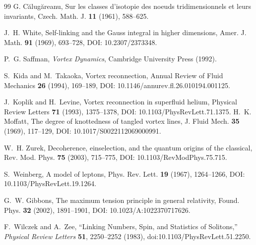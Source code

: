 \documentclass[11pt]{article}
\theoremstyle{definition}
\theoremstyle{plain}
\theoremstyle{remark}
\begin{document}
\begin{thebibliography}{99}
            G. C\u{a}lug\u{a}reanu,
            \newblock Sur les classes d'isotopie des noeuds tridimensionnels et leurs invariants,
            \newblock Czech. Math. J. \textbf{11} (1961), 588--625.

            J.~H. White,
            \newblock Self-linking and the Gauss integral in higher dimensions,
            \newblock Amer. J. Math. \textbf{91} (1969), 693--728,
            \newblock DOI: 10.2307/2373348.

            P.~G. Saffman,
            \newblock \emph{Vortex Dynamics},
            \newblock Cambridge University Press (1992).


            S.~Kida and M.~Takaoka,
            \newblock Vortex reconnection,
            \newblock Annual Review of Fluid Mechanics \textbf{26} (1994), 169--189,
            \newblock DOI: 10.1146/annurev.fl.26.010194.001125.

            J.~Koplik and H.~Levine,
            \newblock Vortex reconnection in superfluid helium,
            \newblock Physical Review Letters \textbf{71} (1993), 1375--1378,
            \newblock DOI: 10.1103/PhysRevLett.71.1375.
            H.~K. Moffatt,
            \newblock The degree of knottedness of tangled vortex lines,
            \newblock J. Fluid Mech. \textbf{35} (1969), 117--129,
            \newblock DOI: 10.1017/S0022112069000991.

            W.~H. Zurek,
            \newblock Decoherence, einselection, and the quantum origins of the classical,
            \newblock Rev. Mod. Phys. \textbf{75} (2003), 715--775,
            \newblock DOI: 10.1103/RevModPhys.75.715.

            S.~Weinberg,
            \newblock A model of leptons,
            \newblock Phys. Rev. Lett. \textbf{19} (1967), 1264--1266,
            \newblock DOI: 10.1103/PhysRevLett.19.1264.

            G.~W. Gibbons,
            \newblock The maximum tension principle in general relativity,
            \newblock Found. Phys. \textbf{32} (2002), 1891--1901,
            \newblock DOI: 10.1023/A:1022370717626.

            F.~Wilczek and A.~Zee,
            \newblock ``Linking Numbers, Spin, and Statistics of Solitons,''
            \newblock \textit{Physical Review Letters} \textbf{51}, 2250--2252 (1983),
            \newblock doi:10.1103/PhysRevLett.51.2250.


\end{thebibliography}
\end{document}
